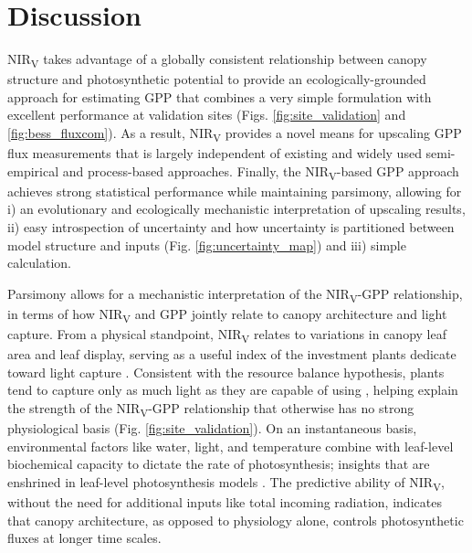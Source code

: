 \documentclass[10pt,letterpaper]{article}
\begin{document}
\section*{Discussion}
NIR\textsubscript{V} takes advantage of a globally consistent relationship between canopy structure and photosynthetic potential to provide  an ecologically-grounded approach for estimating GPP that combines a very simple formulation with excellent performance at validation sites (Figs. \ref{fig:site_validation} and \ref{fig:bess_fluxcom}). As a result, NIR\textsubscript{V} provides a novel means for  upscaling GPP flux measurements  that is largely independent of existing and widely used semi-empirical and process-based approaches. Finally, the NIR\textsubscript{V}-based GPP approach achieves strong statistical performance while maintaining parsimony, allowing for i) an evolutionary and ecologically mechanistic interpretation of upscaling results, ii) easy introspection of uncertainty and how uncertainty is partitioned between model structure and inputs (Fig. \ref{fig:uncertainty_map}) and iii) simple calculation.

Parsimony allows for a mechanistic interpretation of the NIR\textsubscript{V}-GPP relationship, in terms of how NIR\textsubscript{V} and GPP jointly relate to canopy architecture and light capture. From a physical standpoint, NIR\textsubscript{V} relates to variations in canopy leaf area and leaf display, serving as a useful index of the investment plants dedicate toward light capture \cite{Badgley2017}. Consistent with the resource balance hypothesis, plants tend to capture only as much light as they are capable of using \cite{Field1991}, helping explain the strength of the NIR\textsubscript{V}-GPP relationship that otherwise has no strong physiological basis (Fig. \ref{fig:site_validation}). On an instantaneous basis, environmental factors like water, light, and temperature combine with leaf-level biochemical capacity to dictate the rate of photosynthesis; insights that are enshrined in leaf-level photosynthesis models \cite{FvCB}.  The predictive ability of NIR\textsubscript{V}, without the need for additional inputs like total incoming radiation, indicates that canopy architecture, as opposed to physiology alone, controls  photosynthetic fluxes at longer time scales.
\end{document}
